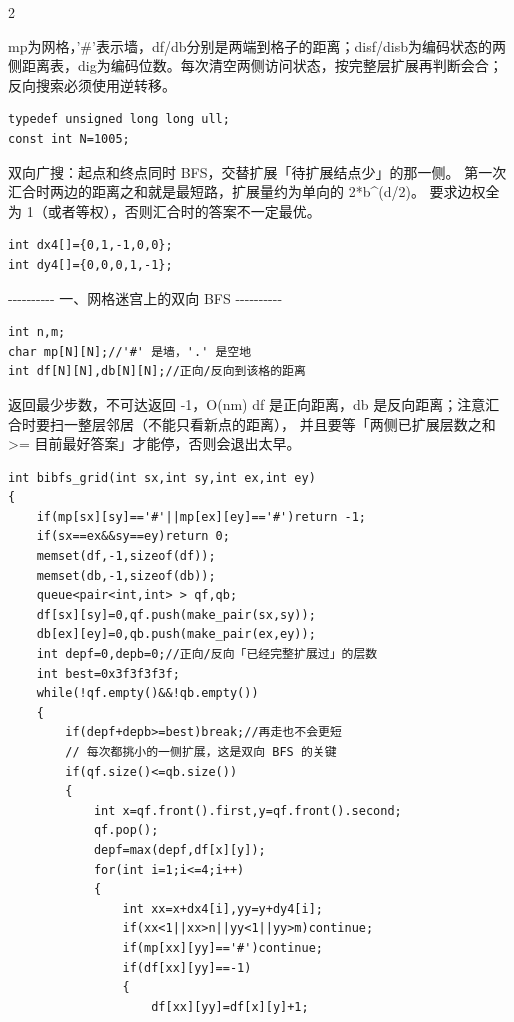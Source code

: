 \documentclass[UTF8,fontset=fandol,a4paper,twoside]{ctexart}
\newcommand{\note}[1]{{\fontsize{10}{12}\selectfont #1\par}}
\begin{document}
\begin{multicols}{2}
\note{mp为网格，'\#'表示墙，df/\allowbreak{}db分别是两端到格子的距离；disf/\allowbreak{}disb为编码状态的两侧距离表，dig为编码位数。每次清空两侧访问状态，按完整层扩展再判断会合；反向搜索必须使用逆转移。}
\begin{lstlisting}
typedef unsigned long long ull;
const int N=1005;
\end{lstlisting}
\note{双向广搜：起点和终点同时 BFS，交替扩展「待扩展结点少」的那一侧。 第一次汇合时两边的距离之和就是最短路，扩展量约为单向的 2*b\textasciicircum{}(\allowbreak{}d/\allowbreak{}2)\allowbreak{}。 要求边权全为 1（或者等权），否则汇合时的答案不一定最优。}
\begin{lstlisting}
int dx4[]={0,1,-1,0,0};
int dy4[]={0,0,0,1,-1};
\end{lstlisting}
\note{-\allowbreak{}-\allowbreak{}-\allowbreak{}-\allowbreak{}-\allowbreak{}-\allowbreak{}-\allowbreak{}-\allowbreak{}-\allowbreak{}-\allowbreak{} 一、网格迷宫上的双向 BFS -\allowbreak{}-\allowbreak{}-\allowbreak{}-\allowbreak{}-\allowbreak{}-\allowbreak{}-\allowbreak{}-\allowbreak{}-\allowbreak{}-\allowbreak{}}
\begin{lstlisting}
int n,m;
char mp[N][N];//'#' 是墙，'.' 是空地
int df[N][N],db[N][N];//正向/反向到该格的距离
\end{lstlisting}
\note{返回最少步数，不可达返回 -\allowbreak{}1，O(\allowbreak{}nm)\allowbreak{} df 是正向距离，db 是反向距离；注意汇合时要扫一整层邻居（不能只看新点的距离）， 并且要等「两侧已扩展层数之和 >\allowbreak{}=\allowbreak{} 目前最好答案」才能停，否则会退出太早。}
\begin{lstlisting}
int bibfs_grid(int sx,int sy,int ex,int ey)
{
    if(mp[sx][sy]=='#'||mp[ex][ey]=='#')return -1;
    if(sx==ex&&sy==ey)return 0;
    memset(df,-1,sizeof(df));
    memset(db,-1,sizeof(db));
    queue<pair<int,int> > qf,qb;
    df[sx][sy]=0,qf.push(make_pair(sx,sy));
    db[ex][ey]=0,qb.push(make_pair(ex,ey));
    int depf=0,depb=0;//正向/反向「已经完整扩展过」的层数
    int best=0x3f3f3f3f;
    while(!qf.empty()&&!qb.empty())
    {
        if(depf+depb>=best)break;//再走也不会更短
        // 每次都挑小的一侧扩展，这是双向 BFS 的关键
        if(qf.size()<=qb.size())
        {
            int x=qf.front().first,y=qf.front().second;
            qf.pop();
            depf=max(depf,df[x][y]);
            for(int i=1;i<=4;i++)
            {
                int xx=x+dx4[i],yy=y+dy4[i];
                if(xx<1||xx>n||yy<1||yy>m)continue;
                if(mp[xx][yy]=='#')continue;
                if(df[xx][yy]==-1)
                {
                    df[xx][yy]=df[x][y]+1;

\end{lstlisting}
\end{multicols}
\end{document}
